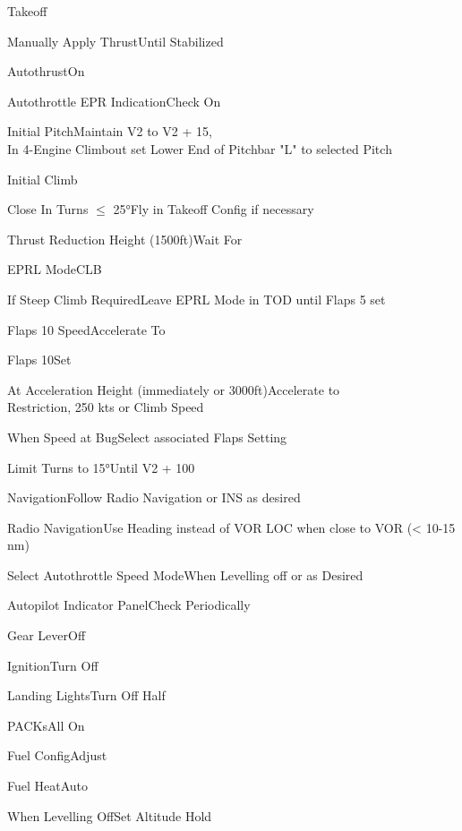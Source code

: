 \documentclass[sim-use, blue_items]{checklist}
\begin{document}
\begin{checklist}{Takeoff}
	\item{Manually Apply Thrust}{Until Stabilized}
	\item{Autothrust}{On}
	\item{Autothrottle EPR Indication}{Check On}
	\item{Initial Pitch}{Maintain V2 to V2 + 15,\\In 4-Engine Climbout set Lower End of Pitchbar "L" to selected Pitch}
\end{checklist}

\begin{checklist}{Initial Climb}
	\item{Close In Turns $\leq$ 25°}{Fly in Takeoff Config if necessary}
	\item{Thrust Reduction Height (1500ft)}{Wait For}
	\item{EPRL Mode}{CLB}
	\item{If Steep Climb Required}{Leave EPRL Mode in TOD until Flaps 5 set}
	 {
		\item{Flaps 10 Speed}{Accelerate To}
		\item{Flaps 10}{Set}
	}
	\item{At Acceleration Height (immediately or 3000ft)}{Accelerate to\\Restriction, 250 kts or Climb Speed}
	\item{When Speed at Bug}{Select associated Flaps Setting}
	\item{Limit Turns to 15°}{Until V2 + 100}
	\item{Navigation}{Follow Radio Navigation or INS as desired}
	\item{Radio Navigation}{Use Heading instead of VOR LOC when close to VOR (< 10-15 nm)}
	\item{Select Autothrottle Speed Mode}{When Levelling off or as Desired}
	\item{Autopilot Indicator Panel}{Check Periodically}
	 {
		\item{Gear Lever}{Off}
		\item{Ignition}{Turn Off}
		\item{Landing Lights}{Turn Off Half}
		\item{PACKs}{All On}
		\item{Fuel Config}{Adjust}
		\item{Fuel Heat}{Auto}
	}
	\item{When Levelling Off}{Set Altitude Hold}
\end{checklist}
\end{document}

